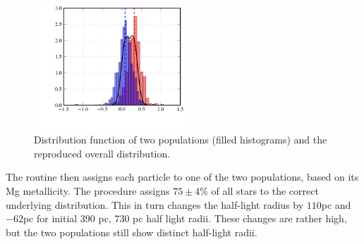 \begin{figure}
\begin{center}
\hspace{-7mm}
\includegraphics[width=0.5\textwidth]{fig/pymcmetals.png}
\caption{Distribution function of two populations (filled histograms) and the reproduced overall distribution.}
\label{fig:pops}
\end{center}
\end{figure}

The routine then assigns each particle to one of the two populations,
based on its Mg metallicity. The procedure assigns $75\pm4\%$ of all
stars to the correct underlying distribution. This in turn changes the
half-light radius by $110$pc and $-62$pc for initial 390 pc, 730 pc
half light radii. These changes are rather high, but the two
populations still show distinct half-light radii.
